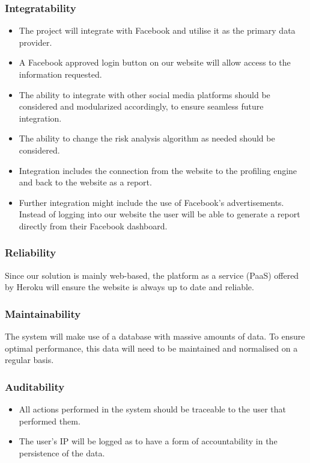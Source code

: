 \documentclass{article}
\begin{document}
		\subsubsection{Integratability}
		\begin{itemize}
			\item The project will integrate with Facebook and utilise it as the primary data provider.
			\item A Facebook approved login button on our website will allow access to the information requested. 
			\item The ability to integrate with other social media platforms should be considered and modularized accordingly, to ensure seamless future integration. 
			\item The ability to change the risk analysis algorithm as needed should be considered.
			\item Integration includes the connection from the website to the profiling engine and back to the website as a report.
			\item Further integration might include the use of Facebook's advertisements. Instead of logging into our website the user will be able to generate a report directly from their Facebook dashboard.
		\end{itemize}		

		\subsubsection{Reliability}
			Since our solution is mainly web-based, the platform as a service (PaaS) offered by Heroku will ensure the website is always up to date and reliable.

		\subsubsection{Maintainability}
			The system will make use of a database with massive amounts of data. To ensure optimal performance, this data will need to be maintained and normalised on a regular basis.

		\subsubsection{Auditability}
		\begin{itemize}
			\item All actions performed in the system should be traceable to the user that performed them.
			\item The user's IP  will be logged as to have a form of accountability in the persistence of the data.
		\end{itemize}
\end{document}
